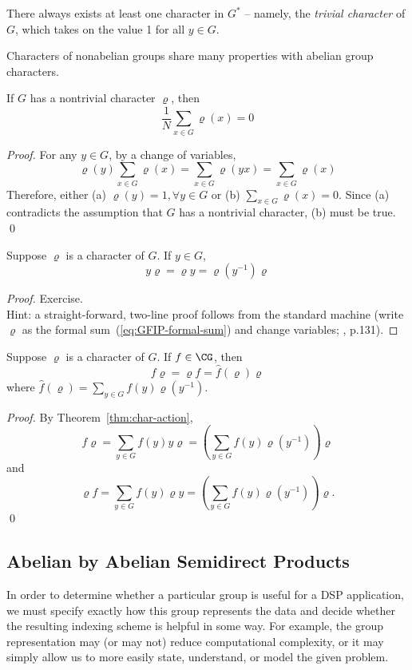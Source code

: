 There always exists at least one character in $G^*$ -- namely, the \emph{trivial character} of
$G$, which takes on the value 1 for all $y\in G$.

Characters of nonabelian groups share many properties with abelian group
characters.
\begin{theorem}
If $G$ has a nontrivial character $\varrho$, then
\[
\frac{1}{N} \sum_{x\in G} \varrho(x) = 0
\]
\end{theorem}
\begin{proof}
For any $y\in G$, by a change of variables,
\[
\varrho(y) \sum_{x\in G} \varrho(x) = \sum_{x\in G} \varrho(yx) = \sum_{x\in G} \varrho(x)
\]
Therefore, either (a) $\varrho(y)=1, \forall y\in G$ or (b) $\sum_{x\in G} \varrho(x) = 0$.
Since (a) contradicts the assumption that $G$ has a nontrivial
character, (b) must be true. \qed
\end{proof}

\begin{theorem}\label{thm:char-action}
Suppose $\varrho$ is a character of $G$.  If $y\in G$, 
\[
y\varrho = \varrho y = \varrho(y^{-1})\varrho
\]
\end{theorem}
\begin{proof}
Exercise.\\
Hint: a straight-forward, two-line proof follows from the standard machine (\ie write
$\varrho$ as the formal sum~(\ref{eq:GFIP-formal-sum}) and change variables;
\cite{An:2003}, p.131). 
\end{proof}

\begin{corollary}
Suppose $\varrho$ is a character of $G$.  If $f\in \CG$, then
\[
f\varrho = \varrho f = \hat{f}(\varrho)\varrho
\]
where $\hat{f}(\varrho) = \sum_{y\in G} f(y) \varrho(y^{-1})$.
\end{corollary}
\begin{proof}
By Theorem~\ref{thm:char-action},
\[
f\varrho = \sum_{y\in G} f(y) y\varrho = \left( \sum_{y\in G} f(y)\varrho(y^{-1})\right) \varrho
\]
and
\[
\varrho f = \sum_{y\in G} f(y) \varrho y = \left( \sum_{y\in G} f(y)\varrho(y^{-1})\right) \varrho.
\]
\qed
\end{proof}


\subsection{Abelian by Abelian Semidirect Products}
In order to determine whether a particular group is useful for a DSP application, we must
specify exactly how this group represents the data and decide whether the resulting 
indexing scheme is helpful in some way.  For example, the group representation
may (or may not) reduce computational complexity, or it may simply allow us to
more easily state, understand, or model the given problem.

